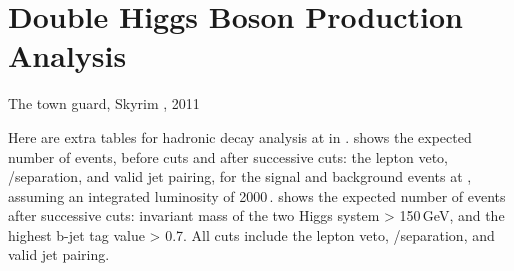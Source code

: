 \chapter{Double Higgs Boson Production Analysis}
\label{app:doubleHiggs}

{The town guard, Skyrim , 2011}

Here are extra tables for hadronic decay analysis at  in .  shows the expected number of events, before cuts and after successive cuts: the lepton veto, \eeToHHbbWW/\eeToHHbbbb separation, and valid jet pairing, for the signal and background events at , assuming an integrated luminosity of 2000\,.  shows the expected number of events after successive cuts: invariant mass of the two Higgs system > 150\,GeV, and the highest b-jet tag value > 0.7. All cuts include the lepton veto, \eeToHHbbWW/\eeToHHbbbb separation, and valid jet pairing.

